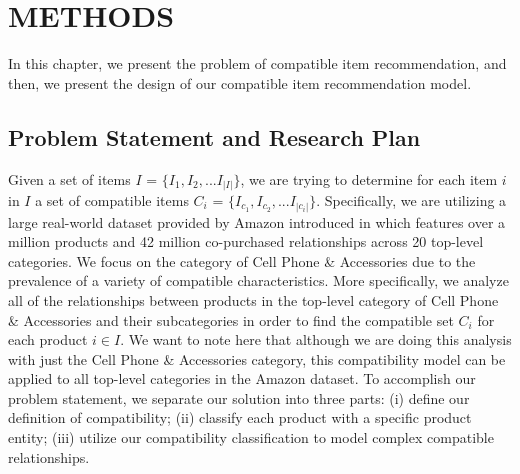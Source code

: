 %
%
%
%



\chapter{METHODS}


In this chapter, we present the problem of compatible item recommendation, and then, we present the design of our compatible item recommendation model.

\section{Problem Statement and Research Plan}
Given a set of items $I$ = $\{I_1, I_2, ... I_{|I|}\}$, we are trying to determine for each item $i$ in $I$ a set of compatible items $C_i$ = $\{ I_{c_1}, I_{c_2}, ... I_{|c_i|} \}$. Specifically, we are utilizing a large real-world dataset provided by Amazon introduced in \cite{mcauley-targett-shi-hengel} which features over a million products and 42 million co-purchased relationships across 20 top-level categories. We focus on the category of Cell Phone \& Accessories due to the prevalence of a variety of compatible characteristics. More specifically, we analyze all of the relationships between products in the top-level category of Cell Phone \& Accessories and their subcategories in order to find the compatible set $C_i$ for each product $i \in I$. We want to note here that although we are doing this analysis with just the Cell Phone \& Accessories category, this compatibility model can be applied to all top-level categories in the Amazon dataset. To accomplish our problem statement, we separate our solution into three parts: (i) define our definition of compatibility; (ii) classify each product with a specific product entity; (iii) utilize our compatibility classification to model complex compatible relationships.

